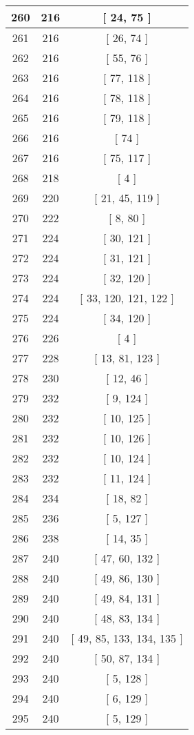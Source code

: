 \begin{center}
\begin{longtable}[H]{|| c c c ||}
260 & 216 & [ 24, 75 ]
\\\hline
261 & 216 & [ 26, 74 ]
\\\hline
262 & 216 & [ 55, 76 ]
\\\hline
263 & 216 & [ 77, 118 ]
\\\hline
264 & 216 & [ 78, 118 ]
\\\hline
265 & 216 & [ 79, 118 ]
\\\hline
266 & 216 & [ 74 ]
\\\hline
267 & 216 & [ 75, 117 ]
\\\hline
268 & 218 & [ 4 ]
\\\hline
269 & 220 & [ 21, 45, 119 ]
\\\hline
270 & 222 & [ 8, 80 ]
\\\hline
271 & 224 & [ 30, 121 ]
\\\hline
272 & 224 & [ 31, 121 ]
\\\hline
273 & 224 & [ 32, 120 ]
\\\hline
274 & 224 & [ 33, 120, 121, 122 ]
\\\hline
275 & 224 & [ 34, 120 ]
\\\hline
276 & 226 & [ 4 ]
\\\hline
277 & 228 & [ 13, 81, 123 ]
\\\hline
278 & 230 & [ 12, 46 ]
\\\hline
279 & 232 & [ 9, 124 ]
\\\hline
280 & 232 & [ 10, 125 ]
\\\hline
281 & 232 & [ 10, 126 ]
\\\hline
282 & 232 & [ 10, 124 ]
\\\hline
283 & 232 & [ 11, 124 ]
\\\hline
284 & 234 & [ 18, 82 ]
\\\hline
285 & 236 & [ 5, 127 ]
\\\hline
286 & 238 & [ 14, 35 ]
\\\hline
287 & 240 & [ 47, 60, 132 ]
\\\hline
288 & 240 & [ 49, 86, 130 ]
\\\hline
289 & 240 & [ 49, 84, 131 ]
\\\hline
290 & 240 & [ 48, 83, 134 ]
\\\hline
291 & 240 & [ 49, 85, 133, 134, 135 ]
\\\hline
292 & 240 & [ 50, 87, 134 ]
\\\hline
293 & 240 & [ 5, 128 ]
\\\hline
294 & 240 & [ 6, 129 ]
\\\hline
295 & 240 & [ 5, 129 ]

\end{longtable}
\end{center}
